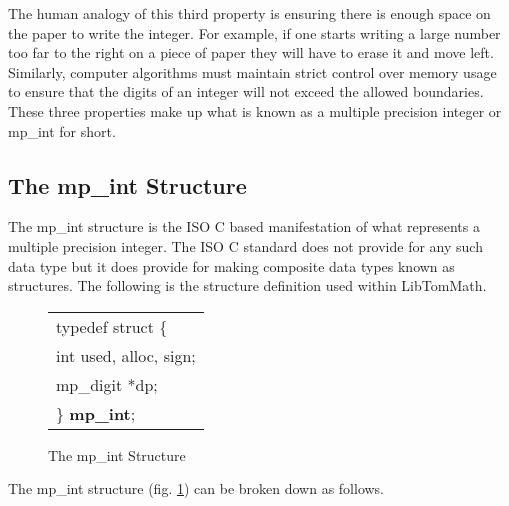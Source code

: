 \documentclass[b5paper]{book}
\begin{document}
The human analogy of this third property is ensuring there is enough space on the paper to write the integer.  For example,
if one starts writing a large number too far to the right on a piece of paper they will have to erase it and move left.  
Similarly, computer algorithms must maintain strict control over memory usage to ensure that the digits of an integer
will not exceed the allowed boundaries.  These three properties make up what is known as a multiple precision 
integer or mp\_int for short.  

\subsection{The mp\_int Structure}
\label{sec:MPINT}
The mp\_int structure is the ISO C based manifestation of what represents a multiple precision integer.  The ISO C standard does not provide for 
any such data type but it does provide for making composite data types known as structures.  The following is the structure definition 
used within LibTomMath.

\begin{figure}[here]
\begin{center}
\begin{small}
\begin{tabular}{|l|}
\hline
typedef struct \{ \\
\hspace{3mm}int used, alloc, sign;\\
\hspace{3mm}mp\_digit *dp;\\
\} \textbf{mp\_int}; \\
\hline
\end{tabular}
\end{small}
\caption{The mp\_int Structure}
\label{fig:mpint}
\end{center}
\end{figure}

The mp\_int structure (fig. \ref{fig:mpint}) can be broken down as follows.
\end{document}
